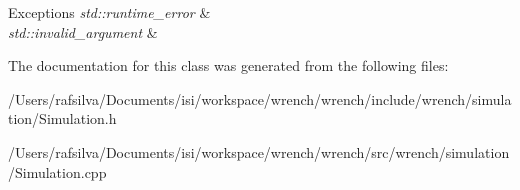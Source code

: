 \begin{DoxyExceptions}{Exceptions}
{\em std\+::runtime\+\_\+error} & \\
\hline
{\em std\+::invalid\+\_\+argument} & \\
\hline
\end{DoxyExceptions}


The documentation for this class was generated from the following files\+:\begin{DoxyCompactItemize}
\item 
/\+Users/rafsilva/\+Documents/isi/workspace/wrench/wrench/include/wrench/simulation/Simulation.\+h\item 
/\+Users/rafsilva/\+Documents/isi/workspace/wrench/wrench/src/wrench/simulation/Simulation.\+cpp\end{DoxyCompactItemize}

